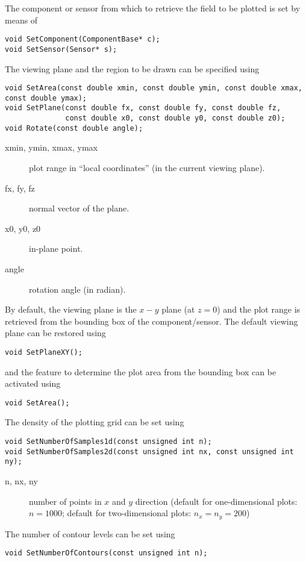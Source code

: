 The component or sensor from which to retrieve the field to be plotted 
is set by means of
\begin{lstlisting}
void SetComponent(ComponentBase* c);
void SetSensor(Sensor* s);
\end{lstlisting}

The viewing plane and the region to be drawn 
can be specified using
\begin{lstlisting}
void SetArea(const double xmin, const double ymin, const double xmax, const double ymax);
void SetPlane(const double fx, const double fy, const double fz,
              const double x0, const double y0, const double z0);
void Rotate(const double angle);
\end{lstlisting}
\begin{description}
  \item[xmin, ymin, xmax, ymax] plot range in ``local coordinates'' (in the current viewing plane).
  \item[fx, fy, fz] normal vector of the plane.
  \item[x0, y0, z0] in-plane point.
  \item[angle] rotation angle (in radian).
\end{description}
By default, the viewing plane is the $x-y$ plane (at $z = 0$) and the 
plot range is retrieved from the bounding box of the component/sensor.
The default viewing plane can be restored using 
\begin{lstlisting}
void SetPlaneXY();
\end{lstlisting}
and the feature to determine the plot area from the bounding box can be activated using 
\begin{lstlisting}
void SetArea();
\end{lstlisting}
 
The density of the plotting grid can be set using
\begin{lstlisting}
void SetNumberOfSamples1d(const unsigned int n);
void SetNumberOfSamples2d(const unsigned int nx, const unsigned int ny);
\end{lstlisting}
\begin{description}
  \item[n, nx, ny]
  number of points in \(x\) and \(y\) direction 
  (default for one-dimensional plots: \(n = 1000\);
   default for two-dimensional plots: \(n_{x} = n_{y} = 200\)) 
\end{description}

The number of contour levels can be set using
\begin{lstlisting}
void SetNumberOfContours(const unsigned int n);
\end{lstlisting}


